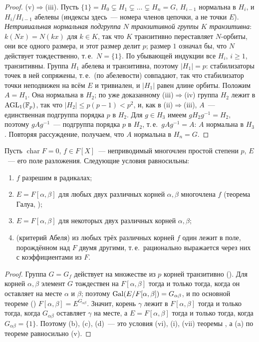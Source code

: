 \begin{proof}
(v)$\Rightarrow$(iii). Пусть $\{1\}=H_0\subsetneq H_1\subsetneq\dots\subsetneq H_n=G$, $H_{i-1}$ нормальна в $H_i$, и $H_i/H_{i-1}$
абелевы (индексы здесь~--- номера членов цепочки, а не точки $E$). \emph{Нетривиальная нормальная подгруппа $N$
транзитивной группы $K$ транзитивна}: $k(Nx)=N(kx)$ для $k\in K$, так что $K$ транзитивно переставляет $N$-орбиты, они все
одного размера, и этот размер делит $p$; размер $1$ означал бы, что $N$ действует тождественно, т.\,е.\ $N=\{1\}$. По
убывающей индукции все $H_i$, $i\ge1$, транзитивны. Группа $H_1$ абелева и транзитивна, поэтому $|H_1|=p$: стабилизаторы
точек в ней сопряжены, т.\,е.\ (по абелевости) совпадают, так что стабилизатор точки неподвижен на всём $E$ и тривиален, и
$|H_1|$ равен длине орбиты. Положим $A=H_1$. Она нормальна в $H_2$; по уже доказанному (iii)$\Rightarrow$(iv) группа $H_2$
лежит в $\mathrm{AGL}_1(\mathbb F_p)$, так что $|H_2|\le p(p-1)<p^2$, и, как в (ii)$\Rightarrow$(iii), $A$~--- единственная подгруппа
порядка $p$ в $H_2$. Для $g\in H_3$ имеем $gH_2g^{-1}=H_2$, поэтому $gAg^{-1}$~--- подгруппа порядка $p$ в $H_2$, т.\,е.\
$gAg^{-1}=A$: $A$ нормальна в $H_3$. Повторяя рассуждение, получаем, что $A$ нормальна в $H_n=G$.
\end{proof}

\begin{corollary}[3.30b]
Пусть $\operatorname{char}F=0$, $f\in F[X]$~--- неприводимый многочлен простой степени $p$, $E$~--- его поле разложения.
Следующие условия равносильны:
\begin{enumerate}[label=\textup{(\alph*)}]
\item $f$ разрешим в радикалах;
\item $E=F[\alpha,\beta]$ для любых двух различных корней $\alpha,\beta$ многочлена $f$ \textup(теорема Галуа, \textup);
\item $E=F[\alpha,\beta]$ для некоторых двух различных корней $\alpha,\beta$;
\item \textup(критерий Абеля\textup) из любых трёх различных корней $f$ один лежит в поле, порождённом над $F$ двумя
другими, т.\,е.\ рационально выражается через них с коэффициентами из $F$.
\end{enumerate}
\end{corollary}

\begin{proof}
Группа $G=G_f$ действует на множестве из $p$ корней транзитивно (). Для корней $\alpha,\beta$ элемент $G$
тождествен на $F[\alpha,\beta]$ тогда и только тогда, когда он оставляет на месте $\alpha$ и $\beta$; поэтому
$\operatorname{Gal}(E/F[\alpha,\beta])=G_{\alpha\beta}$, и по основной теореме (\rf{3.17}) $F[\alpha,\beta]=E^{G_{\alpha\beta}}$. Значит,
корень $\gamma$ лежит в $F[\alpha,\beta]$ тогда и только тогда, когда $G_{\alpha\beta}$ оставляет $\gamma$ на месте, а
$E=F[\alpha,\beta]$ тогда и только тогда, когда $G_{\alpha\beta}=\{1\}$. Поэтому (b), (c), (d)~--- это условия (vi), (i), (vii)
теоремы \rf{3.30a}, а (a) по теореме \rf{3.28} равносильно (v).
\end{proof}

